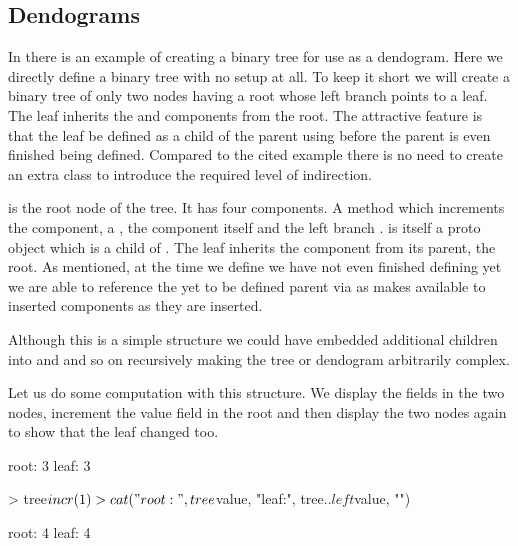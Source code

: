 \documentclass{Z}
\begin{document}
\subsection{Dendograms}

In \cite{Gentleman2002} there is an example of creating a binary tree
for use as a dendogram.  Here we directly define a binary tree with no
setup at all.  To keep it short we will create a binary tree of only
two nodes having a root whose left branch points to a leaf.  The leaf
inherits the  and  components from the root.
The attractive feature is that the leaf be defined as a child of the
parent using  before the parent is even finished
being defined.  Compared to the cited  example there is
no need to create an extra class to introduce the required level of
indirection.

 is the root node of the tree.  It has four components.  A
method  which increments the  component, a
, the  component itself and the left branch
.   is itself a proto object which is a
child of .  The leaf inherits the  component
from its parent, the root.  As mentioned, at the time we define
 we have not even finished defining  yet we
are able to reference the yet to be defined parent via  as
 makes  available to inserted components as
they are inserted.

\begin{Schunk}
\end{Schunk}

Although this is a simple structure we could have embedded additional
children into  and  and so on recursively making
the tree or dendogram arbitrarily complex.

Let us do some computation with this structure.  We display the
 fields in the two nodes, increment the value field in the
root and then display the two nodes again to show that the leaf
changed too.

\begin{Schunk}
\begin{Soutput}
root: 3 leaf: 3 
\end{Soutput}
\begin{Sinput}
> tree$incr(1)
> cat("root:", tree$value, "leaf:", tree$..left$value, "\n")
\end{Sinput}
\begin{Soutput}
root: 4 leaf: 4 
\end{Soutput}
\end{Schunk}
\end{document}
